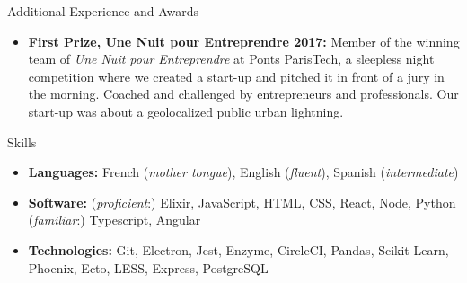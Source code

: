 \documentclass[]{mcdowellcv}
\begin{document}
    \begin{cvsection}{Additional Experience and Awards}
        \begin{cvsubsection}{}{}{}
            \begin{itemize}

                \item \textbf{First Prize, Une Nuit pour Entreprendre 2017:} Member of the winning team of \textit{Une Nuit pour Entreprendre} at Ponts ParisTech, a sleepless
                night competition where we created a start-up and pitched it in front of a jury in the morning.
                Coached and challenged by entrepreneurs and professionals.
                Our start-up was about a geolocalized public urban lightning.

            \end{itemize}
        \end{cvsubsection}
    \end{cvsection}

    \begin{cvsection}{Skills}
        \begin{cvsubsection}{}{}{}
            \begin{itemize}
                \item \textbf{Languages:} French (\textit{mother tongue}), English (\textit{fluent}), Spanish (\textit{intermediate})
                \item \textbf{Software:} (\textit{proficient}:) Elixir, JavaScript, HTML, CSS, React, Node, Python (\textit{familiar}:) Typescript, Angular
                \item \textbf{Technologies:} Git, Electron, Jest, Enzyme, CircleCI, Pandas, Scikit-Learn, Phoenix, Ecto, LESS, Express, PostgreSQL
            \end{itemize}
        \end{cvsubsection}
    \end{cvsection}
\end{document}
